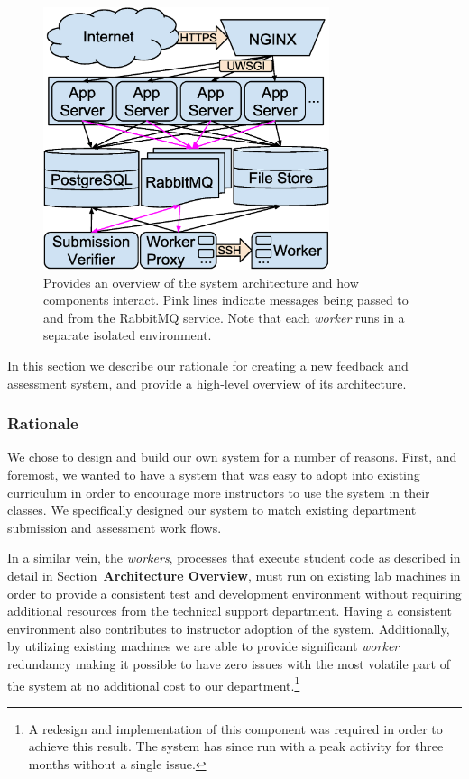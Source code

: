 \begin{figure}[!t]
\centering \includegraphics[width=3.3in]{graphs/architecture.eps}
\caption{Provides an overview of the system architecture and how components
  interact. Pink lines indicate messages being passed to and from the RabbitMQ
  service. Note that each \emph{worker} runs in a separate isolated
  environment.}
\end{figure}

In this section we describe our rationale for creating a new feedback and
assessment system, and provide a high-level overview of its architecture.

\subsubsection{Rationale}
We chose to design and build our own system for a number of reasons. First, and
foremost, we wanted to have a system that was easy to adopt into existing
curriculum in order to encourage more instructors to use the system in their
classes. We specifically designed our system to match existing department
submission and assessment work flows.

In a similar vein, the \emph{workers}, processes that execute student code as
described in detail in Section~\textbf{Architecture Overview}, must run on
existing lab machines in order to provide a consistent test and development
environment without requiring additional resources from the technical support
department. Having a consistent environment also contributes to instructor
adoption of the system. Additionally, by utilizing existing machines we are
able to provide significant \emph{worker} redundancy making it possible to have
zero issues with the most volatile part of the system at no additional cost to
our department.\footnote{A redesign and implementation of this component was
  required in order to achieve this result. The system has since run with a
  peak activity for three months without a single issue.}

